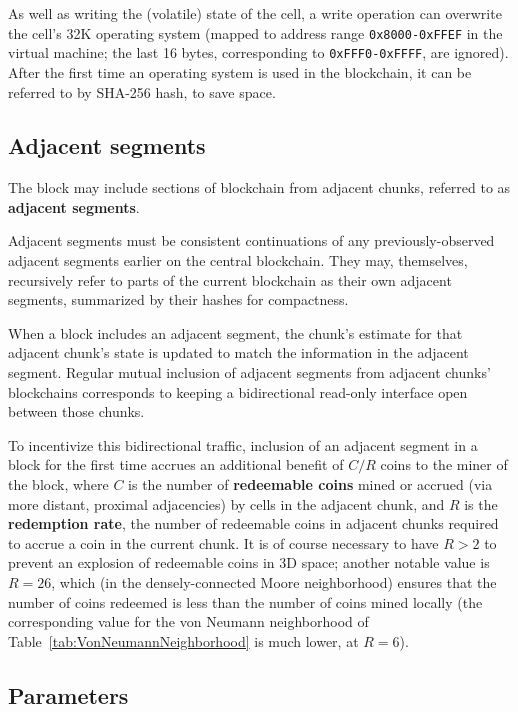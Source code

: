 \documentclass{article}
\newcommand\hex[1]{{\tt 0x#1}}
\newcommand\hexrange[2]{\hex{#1}{\tt -}\hex{#2}}
\begin{document}
As well as writing the (volatile) state of the cell, a write operation can overwrite the cell's 32K operating system
(mapped to address range \hexrange{8000}{FFEF} in the virtual machine; the last 16 bytes, corresponding to \hexrange{FFF0}{FFFF}, are ignored).
After the first time an operating system is used in the blockchain, it can be referred to by SHA-256 hash, to save space.

\subsection{Adjacent segments}
\label{sec:AdjacentSegments}

The block may include sections of blockchain from adjacent chunks,
referred to as {\bf adjacent segments}.

Adjacent segments must be consistent continuations of any previously-observed adjacent segments
earlier on the central blockchain.
They may, themselves, recursively refer to parts of the current blockchain as their own adjacent segments,
summarized by their hashes for compactness.

When a block includes an adjacent segment, the chunk's estimate for that adjacent chunk's state is updated to match the information in the adjacent segment.
Regular mutual inclusion of adjacent segments from adjacent chunks' blockchains
corresponds to keeping a bidirectional read-only interface open between those chunks.

To incentivize this bidirectional traffic,
inclusion of an adjacent segment in a block for the first time
accrues an additional benefit of $C/R$ coins to the miner of the block,
where $C$ is the number of {\bf redeemable coins} mined or accrued (via more distant, proximal adjacencies)
by cells in the adjacent chunk,
and $R$ is the {\bf redemption rate}, the number of redeemable coins in adjacent chunks
required to accrue a coin in the current chunk.
It is of course necessary to have $R>2$ to prevent an explosion of redeemable coins in 3D space;
another notable value is $R=26$, which (in the densely-connected Moore neighborhood)
ensures that the number of coins redeemed is less than the number of coins mined locally
(the corresponding value for the von Neumann neighborhood of Table~\ref{tab:VonNeumannNeighborhood}
is much lower, at $R=6$).

\subsection{Parameters}
\end{document}

